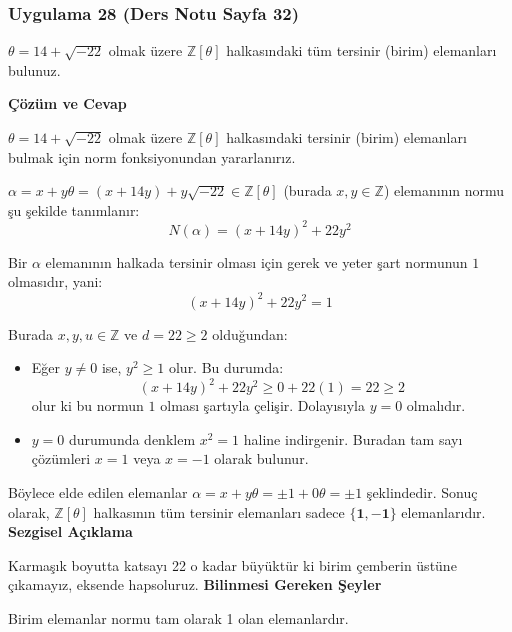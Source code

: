 \documentclass[11pt, a4paper]{article}
\newenvironment{cozum}{
    \vspace{0.5cm}
    \noindent\textcolor{green!60!black}{\faCheckCircle\enspace \textbf{\Large Çözüm ve Cevap}}\par\vspace{0.2cm}
}{}
\newenvironment{sezgisel}{
    \vspace{0.5cm}
    \noindent\textcolor{orange!80!black}{\faLightbulb\enspace \textbf{\Large Sezgisel Açıklama}}\par\vspace{0.2cm}
    \itshape
}{}
\newenvironment{bilgi}{
    \vspace{0.5cm}
    \noindent\textcolor{red!70!black}{\faExclamationTriangle\enspace \textbf{\Large Bilinmesi Gereken Şeyler}}\par\vspace{0.2cm}
}{}
\begin{document}
\subsubsection{Uygulama 28 (Ders Notu Sayfa 32)}
\begin{sorubox}
$\theta = 14 + \sqrt{-22}$ olmak üzere $\mathbb{Z}[\theta]$ halkasındaki tüm tersinir (birim) elemanları bulunuz.
\end{sorubox}
\begin{cozum}
$\theta = 14 + \sqrt{-22}$ olmak üzere $\mathbb{Z}[\theta]$ halkasındaki tersinir (birim) elemanları bulmak için norm fonksiyonundan yararlanırız.

$\alpha = x + y\theta = (x + 14y) + y\sqrt{-22} \in \mathbb{Z}[\theta]$ (burada $x, y \in \mathbb{Z}$) elemanının normu şu şekilde tanımlanır:
\[ N(\alpha) = (x + 14y)^2 + 22 y^2 \]

Bir $\alpha$ elemanının halkada tersinir olması için gerek ve yeter şart normunun $1$ olmasıdır, yani:
\[ (x + 14y)^2 + 22 y^2 = 1 \]

Burada $x, y, u \in \mathbb{Z}$ ve $d = 22 \ge 2$ olduğundan:
\begin{itemize}
    \item Eğer $y \neq 0$ ise, $y^2 \ge 1$ olur. Bu durumda:
    \[ (x + 14y)^2 + 22 y^2 \ge 0 + 22(1) = 22 \ge 2 \]
    olur ki bu normun $1$ olması şartıyla çelişir. Dolayısıyla $y = 0$ olmalıdır.
    \item $y = 0$ durumunda denklem $x^2 = 1$ haline indirgenir. Buradan tam sayı çözümleri $x = 1$ veya $x = -1$ olarak bulunur.
\end{itemize}

Böylece elde edilen elemanlar $\alpha = x + y\theta = \pm 1 + 0\theta = \pm 1$ şeklindedir. Sonuç olarak, $\mathbb{Z}[\theta]$ halkasının tüm tersinir elemanları sadece $\mathbf{\{1, -1\}}$ elemanlarıdır.
\end{cozum}
\begin{sezgisel}
Karmaşık boyutta katsayı 22 o kadar büyüktür ki birim çemberin üstüne çıkamayız, eksende hapsoluruz.
\end{sezgisel}
\begin{bilgi}
Birim elemanlar normu tam olarak 1 olan elemanlardır.
\end{bilgi}

\newpage
\end{document}

